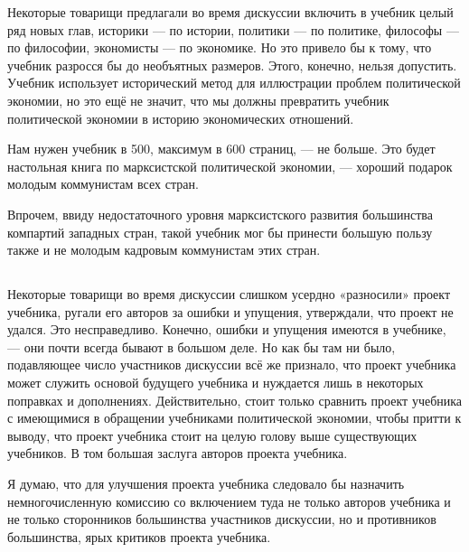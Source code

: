 \documentclass[12pt, a4paper, openany]{book}
\begin{document}
Некоторые товарищи предлагали во время дискуссии включить в учебник целый ряд новых глав, историки — по истории, политики — по политике, философы — по философии, экономисты — по экономике. Но это привело бы к тому, что учебник разросся бы до необъятных размеров. Этого, конечно, нельзя допустить. Учебник использует исторический метод для иллюстрации проблем политической экономии, но это ещё не значит, что мы должны превратить учебник политической экономии в историю экономических отношений.



Нам нужен учебник в 500, максимум в 600 страниц, — не больше. Это будет настольная книга по марксистской политической экономии, — хороший подарок молодым коммунистам всех стран.



Впрочем, ввиду недостаточного уровня марксистского развития большинства компартий западных стран, такой учебник мог бы принести большую пользу также и не молодым кадровым коммунистам этих стран.



\vspace{0.4cm}



\subsection[10. Пути улучшения проекта учебника политической экономии]{}



Некоторые товарищи во время дискуссии слишком усердно «разносили» проект учебника, ругали его авторов за ошибки и упущения, утверждали, что проект не удался. Это несправедливо. Конечно, ошибки и упущения имеются в учебнике, — они почти всегда бывают в большом деле. Но как бы там ни было, подавляющее число участников дискуссии всё же признало, что проект учебника может служить основой будущего учебника и нуждается лишь в некоторых поправках и дополнениях. Действительно, стоит только сравнить проект учебника с имеющимися в обращении учебниками политической экономии, чтобы притти к выводу, что проект учебника стоит на целую голову выше существующих учебников. В том большая заслуга авторов проекта учебника.



Я думаю, что для улучшения проекта учебника следовало бы назначить немногочисленную комиссию со включением туда не только авторов учебника и не только сторонников большинства участников дискуссии, но и противников большинства, ярых критиков проекта учебника.
\end{document}
